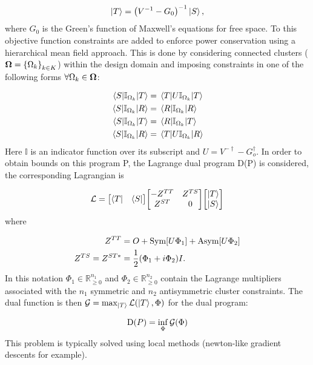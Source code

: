 \documentclass[reprint]{revtex4-2}
\newcommand{\sym}[1]{\text{Sym}\qty[#1]}
\newcommand{\asym}[1]{\text{Asym}\qty[#1]}
\begin{document}
\begin{align}
	\ket{T} = \qty(V^{-1} - G_0)^{-1}\ket{S},
\end{align}
where $G_0$ is the Green's function of Maxwell's equations for free space. To this objective function constraints are added to enforce power conservation using a hierarchical mean field approach\cite{molesky2020hierarchical}. This is done by considering connected clusters ($\vb{\Omega} = \qty{\Omega_k}_{k\in K}$) within the design domain and imposing constraints in one of the following forms $\forall \Omega_k\in\vb{\Omega}$:

\begin{align}
	\mel{S}{\mathbb{I}_{\Omega_k}}{T} &= \mel{T}{U\mathbb{I}_{\Omega_k}}{T}\\
	\mel{S}{\mathbb{I}_{\Omega_k}}{R} &= \mel{R}{\mathbb{I}_{\Omega_k}}{R}\notag\\
	\mel{S}{\mathbb{I}_{\Omega_k}}{T} &= \mel{R}{\mathbb{I}_{\Omega_k}}{T}\notag\\
	\mel{S}{\mathbb{I}_{\Omega_k}}{R} &= \mel{T}{U\mathbb{I}_{\Omega_k}}{R}\notag
\end{align}
Here $\mathbb{I}$ is an indicator function over its subscript and $U=V^{-\dagger}-G_o^\dagger$. In order to obtain bounds on this program P, the Lagrange dual program D(P) is considered, the corresponding Lagrangian is

\begin{align}
	\mathcal{L} = \mqty[\bra{T} & \bra{S}]\mqty[-Z^{TT} & Z^{TS} \\ Z^{ST} & 0]\mqty[\ket{T} \\ \ket{S}]
\end{align}
where

\begin{align}
	\label{eq:lagrange_vars}
	Z^{TT} &= O + \sym{U\Phi_1} + \asym{U\Phi_2}\\
	Z^{TS} = Z^{ST*} &= \frac{1}{2}\qty(\Phi_1 + i\Phi_2)I.\notag
\end{align}
In this notation $\Phi_1 \in \mathbb{R}_{\ge 0}^{n_1}$ and $\Phi_2 \in \mathbb{R}_{\ge 0}^{n_2}$ contain the Lagrange multipliers associated with the $n_1$ symmetric and $n_2$ antisymmetric cluster constraints. The dual function is then $\mathcal{G} = \max_{\ket{T}}\mathcal{L}\qty(\ket{T}, \Phi)$ for the dual program:

\begin{align}
	\text{D}\qty(P) = \inf_{\Phi} \mathcal{G}(\Phi)
\end{align}
This problem is typically solved using local methods (newton-like gradient descents for example). 
\end{document}
